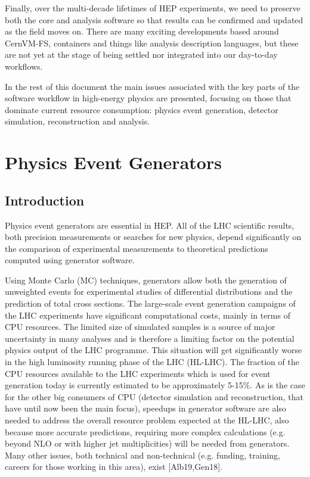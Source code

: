 \documentclass[11pt,a4paper]{article}
\begin{document}
Finally, over the multi-decade lifetimes of HEP experiments, we need to
preserve both the core and analysis software so that results can be
confirmed and updated as the field moves on. There are many exciting
developments based around CernVM-FS, containers and things like analysis
description languages, but these are not yet at the stage of being
settled nor integrated into our day-to-day workflows.

In the rest of this document the main issues associated with the key
parts of the software workflow in high-energy physics are presented,
focusing on those that dominate current resource consumption: physics
event generation, detector simulation, reconstruction and analysis.

\hypertarget{physics-event-generators}{%
\section{Physics Event Generators}\label{physics-event-generators}}

\hypertarget{introduction-1}{%
\subsection{Introduction}\label{introduction-1}}

Physics event generators are essential in HEP. All of the LHC scientific
results, both precision measurements or searches for new physics, depend
significantly on the comparison of experimental measurements to
theoretical predictions computed using generator software.

Using Monte Carlo (MC) techniques, generators allow both the generation
of unweighted events for experimental studies of differential
distributions and the prediction of total cross sections. The
large-scale event generation campaigns of the LHC experiments have
significant computational costs, mainly in terms of CPU resources. The
limited size of simulated samples is a source of major uncertainty in
many analyses and is therefore a limiting factor on the potential
physics output of the LHC programme. This situation will get
significantly worse in the high luminosity running phase of the LHC
(HL-LHC). The fraction of the CPU resources available to the LHC
experiments which is used for event generation today is currently
estimated to be approximately 5-15\%. As is the case for the other big
consumers of CPU (detector simulation and reconstruction, that have
until now been the main focus), speedups in generator software are also
needed to address the overall resource problem expected at the HL-LHC,
also because more accurate predictions, requiring more complex
calculations (e.g. beyond NLO or with higher jet multiplicities) will be
needed from generators. Many other issues, both technical and
non-technical (e.g. funding, training, careers for those working in this
area), exist {[}Alb19,Gen18{]}.
\end{document}
